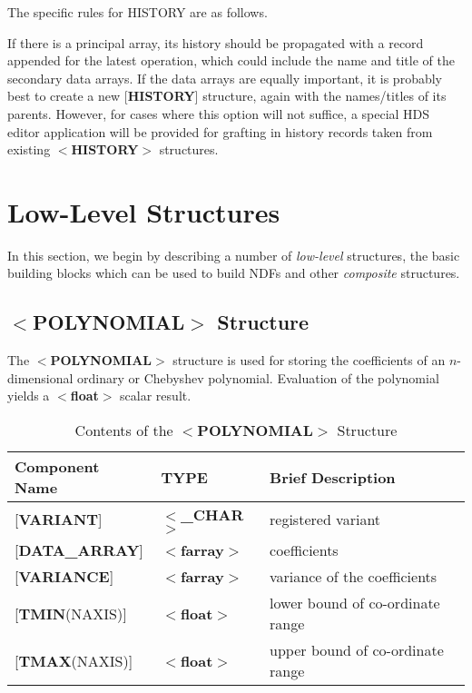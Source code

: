 The specific rules for HISTORY are as follows.

If there is a principal array, its history should be propagated with
a record appended for the latest operation, which could include the
name and title of the secondary data arrays.  If the data arrays are
equally important, it is probably best
to create a new {[}{\bf HISTORY}{]} structure,
again with the names/titles of its parents.  However, for cases
where this option will not suffice, a special
HDS editor application will be provided for grafting
in history records taken from
existing $<${\bf HISTORY}$>$ structures.

\section{Low-Level Structures\label{se:basic}}

In this section, we begin by describing a number of
{\it low-level} structures, the basic building blocks which
can be used to build NDFs and other {\it composite} structures.

\subsection{$<${\bf POLYNOMIAL}$>$ Structure\label{se:spolynomial}}

The $<${\bf POLYNOMIAL}$>$ structure is used for storing the coefficients of an
$n$-dimensional ordinary or Chebyshev polynomial.  Evaluation of
the polynomial yields a $<${\bf float}$>$ scalar result.

\begin{table}[hbt]
\centering
\caption{Contents of the $<${\bf POLYNOMIAL}$>$ Structure}
\begin{tabular}{|l|l|l|}
\hline
Component Name & TYPE & Brief Description \\ \hline
{[}{\bf VARIANT}{]} & $<${\bf \_CHAR}$>$ & registered variant \\
{[}{\bf DATA\_ARRAY}{]} & $<${\bf farray}$>$ & coefficients \\
{[}{\bf VARIANCE}{]}  & $<${\bf farray}$>$ & variance of the coefficients \\
{[}{\bf TMIN}(NAXIS){]} & $<${\bf float}$>$ & lower bound of co-ordinate range\\
{[}{\bf TMAX}(NAXIS){]} & $<${\bf float}$>$ & upper bound of co-ordinate range\\ \hline
\end{tabular}
\end{table}

